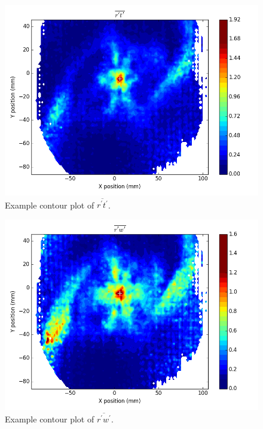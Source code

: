 {\begin{figure}[H]
	\centering
	\includegraphics[width=5in]{figs/example_vortex_figs/example_rt_contour}
\caption{Example contour plot of $\overline{r^\prime t^\prime}$.}
\label{fig:examp_rt}
\end{figure}

\begin{figure}[H]
	\centering
	\includegraphics[width=5in]{figs/example_vortex_figs/example_rw_contour}
\caption{Example contour plot of $\overline{r^\prime w^\prime}$.}
\label{fig:examp_rw}
\end{figure}

}
